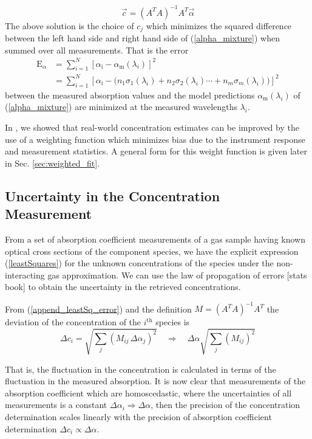 \documentclass[8pt,a4paper]{report}
\begin{document}
	\begin{equation}\label{leastSquares}
		\vec{c} = (A^T A)^{-1} A^T \vec{\alpha}
	\end{equation}
	The above solution is the choice of $c_j$ which minimizes the squared difference between the left hand side and right hand side of (\ref{alpha_mixture}) when summed over all measurements. That is the error
	\begin{align} \label{error_alpha}
		\mathrm{E}_\alpha &= \sum_{i=1}^{N} \left[\alpha_\mathrm{i} - \alpha_\mathrm{m}\left(\lambda_i\right) \right]^2 \nonumber \\ 
		&= \sum_{i=1}^{N} \left[\alpha_\mathrm{i} - \Big(n_1 \sigma_1(\lambda_i) + n_2 \sigma_2(\lambda_i) \cdots + n_m \sigma_m(\lambda_i) \Big) \right]^2
	\end{align}
	between the measured absorption values and the model predictions $\alpha_\mathrm{m}\left(\lambda_i\right)$ of (\ref{alpha_mixture}) are minimized at the measured wavelengths $\lambda_i$.
	
	In \cite{mine_acetone}, we showed that real-world concentration estimates can be improved by the use of a weighting function which minimizes bias due to the instrument response and measurement statistics. A general form for this weight function is given later in Sec. \ref{sec:weighted_fit}.
	
	\subsection{Uncertainty in the Concentration Measurement}
	From a set of absorption coefficient measurements of a gas sample having known optical cross sections of the component species, we have the explicit expression (\ref{leastSquares}) for the unknown concentrations of the species under the non-interacting gas approximation. We can use the law of propagation of errors [stats book] to obtain the uncertainty in the retrieved concentrations.
	
	From (\ref{append_leastSq_error}) and the definition $M = (A^T A)^{-1} A^T$  the deviation of the concentration of the $i^\mathrm{th}$ species is
	\begin{equation} \label{error_conc_alpha}
		\Delta {c_i} = \sqrt{\sum_j \left(M_{ij} \, \Delta {\alpha_j}\right)^2} \quad \Rightarrow \quad \Delta \alpha \sqrt{\sum_j \left(M_{ij} \right)^2}
	\end{equation}
	
	That is, the fluctuation in the concentration is calculated in terms of the fluctuation in the measured absorption. It is now clear that measurements of the absorption coefficient which are homoscedastic, where the uncertainties of all measurements is a constant $\Delta \alpha_i \Rightarrow \Delta \alpha$, then the precision of the concentration determination scales linearly with the precision of absorption coefficient determination $\Delta c_i \propto \Delta \alpha$.
	
\end{document}
